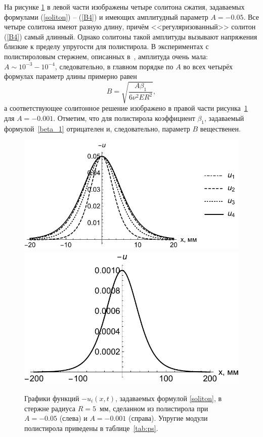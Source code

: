 \documentclass[12pt, a4paper]{report}
\begin{document}
На рисунке \ref{fig:soliton} в левой части изображены четыре солитона сжатия, задаваемых формулами (\ref{soliton}) -- (\ref{B4}) и имеющих амплитудный параметр $A = -0.05$. Все четыре солитона имеют разную длину, причём <<регуляризованный>> солитон (\ref{B4}) самый длинный. Однако солитоны такой амплитуды вызывают напряжения близкие к пределу упругости для полистирола. В экспериментах с полистироловым стержнем, описанных в~\cite{Garbuzov}, амплитуда очень мала: $A \sim 10^{-3} - 10^{-4}$, следовательно, в главном порядке по $A$ во всех четырёх формулах параметр длины примерно равен
\begin{equation}\label{}
B = \sqrt{\frac{A\beta_1}{6\nu^2 E R^2}},
\end{equation}
а соответствующее солитонное решение изображено в правой части рисунка~\ref{fig:soliton} для $A = -0.001$. Отметим, что для полистирола коэффициент $\beta_1$, задаваемый формулой~\eqref{beta_1} отрицателен и, следовательно, параметр $B$ вещественен.
\begin{figure}[h]
	\centering
	\includegraphics[width=0.54\linewidth]{3a_FourSolitonsBlack}
	\includegraphics[width=0.42\linewidth]{3b_SingleSoliton}
	\caption{Графики функций $-u_i(x,t)$, задаваемых формулой \eqref{soliton}, в стержне радиуса $R = 5$~мм, сделанном из полистирола при $A = -0.05$ (слева) и $A= -0.001$ (справа). Упругие модули полистирола приведены в таблице~\ref{tab:ps}.}
	\label{fig:soliton}
\end{figure}
\end{document}
